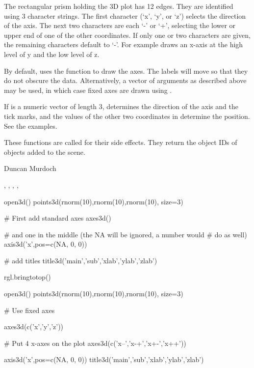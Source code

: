 \documentclass{article}
\begin{document}
\begin{Details}\relax
The rectangular prism holding the 3D plot has 12 edges.  They are identified
using 3 character strings.  The first character (`x', `y', or `z') selects 
the direction of the axis.  The next two characters are each `-' or `+',
selecting the lower or upper end of one of the other coordinates.  If only
one or two characters are given, the remaining characters default to `-'.  
For example  draws an x-axis at the high level of y and the
low level of z.

By default,  uses the  function to draw the axes.  
The labels will move so that they do not obscure the data.  Alternatively,
a vector of arguments as described above may be used, in which case
fixed axes are drawn using .

If  is a numeric vector of length 3,  determines
the direction of the axis and the tick marks, and the values of the
other two coordinates in  determine the position.  See the
examples.
\end{Details}
\begin{Value}
These functions are called for their side effects.  They return the object IDs of
objects added to the scene.
\end{Value}
\begin{Author}\relax
Duncan Murdoch
\end{Author}
\begin{SeeAlso}\relax
{}, ,
, , 
\end{SeeAlso}
\begin{Examples}
\begin{ExampleCode}
  open3d()
  points3d(rnorm(10),rnorm(10),rnorm(10), size=3)

  # First add standard axes
  axes3d()  

  # and one in the middle (the NA will be ignored, a number would 
  # do as well)
  axis3d('x',pos=c(NA, 0, 0))

  # add titles
  title3d('main','sub','xlab','ylab','zlab')

  rgl.bringtotop()
  
  open3d()
  points3d(rnorm(10),rnorm(10),rnorm(10), size=3)
  
  # Use fixed axes
  
  axes3d(c('x','y','z'))
         
  # Put 4 x-axes on the plot
  axes3d(c('x--','x-+','x+-','x++'))         
  
  axis3d('x',pos=c(NA, 0, 0))     
  title3d('main','sub','xlab','ylab','zlab')
\end{ExampleCode}
\end{Examples}
\end{document}
